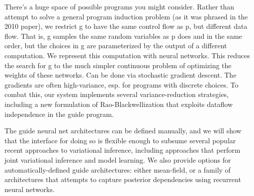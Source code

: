 There's a huge space of possible programs you might consider.
Rather than attempt to solve a general program induction problem (as it was phrased in the 2010 paper), we restrict g to have the same control flow as p, but different data flow.
That is, g samples the same random variables as p does and in the same order, but the choices in g are parameterized by the output of a different computation.
We represent this computation with neural networks.
This reduces the search for g to the much simpler continuous problem of optimizing the weights of these networks.
Can be done via stochastic gradient descent.
The gradients are often high-variance, esp. for programs with discrete choices.
To combat this, our system implements several variance-reduction strategies, including a new formulation of Rao-Blackwellization that exploits dataflow independence in the guide program.

The guide neural net architectures can be defined manually, and we will show that the interface for doing so is flexible enough to subsume several popular recent approaches to variational inference, including approaches that perform joint variational inference and model learning.
We also provide options for automatically-defined guide architectures: either mean-field, or a family of architectures that attempts to capture posterior dependencies using recurrent neural networks.